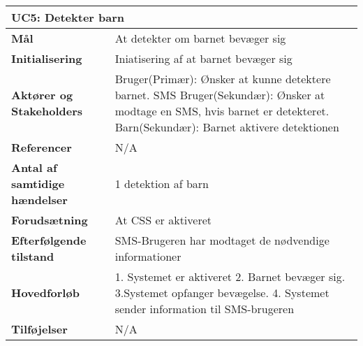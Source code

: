 \begin{table}[H] \centering
\begin{tabular}{|p{6cm}|p{8cm}|}
	\hline
\multicolumn{2}{|l|}{\textbf{UC5: Detekter barn}} \\\hline
\textbf{Mål}								&At detekter om barnet bevæger sig \\\hline
\textbf{Initialisering}					&Iniatisering af at barnet bevæger sig \\\hline
\textbf{Aktører og Stakeholders}			&Bruger(Primær): Ønsker at kunne detektere barnet. SMS Bruger(Sekundær): 																	Ønsker at modtage en SMS, hvis barnet er detekteret. Barn(Sekundær): Barnet aktivere detektionen 				 \\\hline
\textbf{Referencer}						&N/A \\\hline
\textbf{Antal af samtidige hændelser}	&1 detektion af barn \\\hline
\textbf{Forudsætning}					&At CSS er aktiveret \\\hline
\textbf{Efterfølgende tilstand}			&SMS-Brugeren har modtaget de nødvendige informationer \\\hline
\textbf{Hovedforløb}					&1. Systemet er aktiveret 2. Barnet bevæger sig. 3.Systemet opfanger bevægelse. 4. 													Systemet sender information til SMS-brugeren \\\hline
\textbf{Tilføjelser}					&N/A \\\hline
	\end{tabular}
	\label{UC5} 
\end{table}